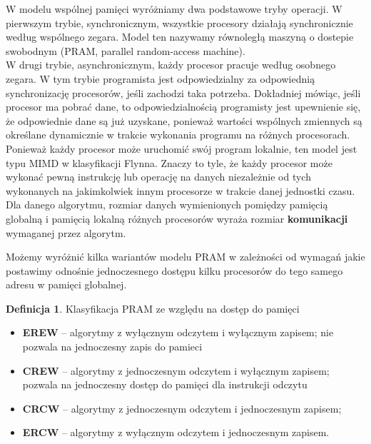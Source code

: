 \documentclass[a4paper,oneside,leqno,12pt]{book}
\theoremstyle{definition}
\newtheorem{definicja}{Definicja}[chapter]
\theoremstyle{plain}
\theoremstyle{remark}
\begin{document}
W modelu wspólnej pamięci wyróżniamy dwa podstawowe tryby operacji. W pierwszym trybie, synchronicznym, wszystkie procesory działają synchronicznie według wspólnego zegara. Model ten nazywamy równoległą maszyną o dostepie swobodnym (PRAM, parallel random-access machine).\\
W drugi trybie, asynchronicznym, każdy procesor pracuje według osobnego zegara. W tym trybie programista jest odpowiedzialny za odpowiednią synchronizację procesorów, jeśli zachodzi taka potrzeba. Dokładniej mówiąc, jeśli procesor ma pobrać dane, to odpowiedzialnością programisty jest upewnienie się, że odpowiednie dane są już uzyskane, ponieważ wartości wspólnych zmiennych są określane dynamicznie w trakcie wykonania programu na różnych procesorach.\\

Ponieważ każdy procesor może uruchomić swój program lokalnie, ten model jest typu MIMD w klasyfikacji Flynna. Znaczy to tyle, że każdy procesor może wykonać pewną instrukcję lub operację na danych niezależnie od tych wykonanych na jakimkolwiek innym procesorze w trakcie danej jednostki czasu.\\

Dla danego algorytmu, rozmiar danych wymienionych pomiędzy pamięcią globalną i pamięcią lokalną różnych procesorów wyraża rozmiar \textbf{komunikacji} wymaganej przez algorytm.



Możemy wyróżnić kilka wariantów modelu PRAM w zależności od wymagań jakie postawimy odnośnie jednoczesnego dostępu kilku procesorów do tego samego adresu w pamięci globalnej.\\
\begin{definicja}{Klasyfikacja PRAM ze względu na dostęp do pamięci}
\begin{itemize}
\item\textbf{EREW} -- algorytmy z wyłącznym odczytem i wyłącznym zapisem; nie pozwala na jednoczesny zapis do pamieci\\
\item\textbf{CREW} -- algorytmy z jednoczesnym odczytem i wyłącznym zapisem; pozwala na jednoczesny  dostęp do pamięci dla instrukcji odczytu\\
\item\textbf{CRCW} -- algorytmy z jednoczesnym odczytem i jednoczesnym zapisem;\\
\item\textbf{ERCW} -- algorytmy z wyłącznym odczytem i jednoczesnym zapisem.\\
\end{itemize}
\end{definicja}
\end{document}
